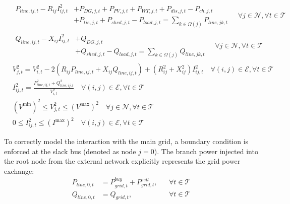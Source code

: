 \begin{subequations} \label{eq:distflow_original}
\begin{align}
    & \begin{aligned} \label{eq:P_balance}
        P_{line,ij,t} - R_{ij} I_{ij,t}^2 &+ P_{DG,j,t} + P_{PV,j,t} + P_{WT,j,t} + P_{dis,j,t} - P_{ch,j,t} \\
        &+ P_{tie,j,t} + P_{shed,j,t} - P_{load,j,t} = \sum_{k \in \Omega(j)} P_{line,jk,t}
    \end{aligned} \quad \forall j \in \mathcal{N}, \forall t \in \mathcal{T} \\
    & \begin{aligned} \label{eq:Q_balance}
        Q_{line,ij,t} - X_{ij} I_{ij,t}^2 &+ Q_{DG,j,t} \\
        &+ Q_{shed,j,t} - Q_{load,j,t} = \sum_{k \in \Omega(j)} Q_{line,jk,t}
    \end{aligned} \quad \forall j \in \mathcal{N}, \forall t \in \mathcal{T} \\
    & V_{j,t}^2 = V_{i,t}^2 - 2(R_{ij}P_{line,ij,t} + X_{ij}Q_{line,ij,t}) + (R_{ij}^2 + X_{ij}^2)I_{ij,t}^2 \quad \forall (i,j) \in \mathcal{E}, \forall t \in \mathcal{T} \label{eq:voltage_drop} \\
    & I_{ij,t}^2 = \frac{P_{line,ij,t}^2 + Q_{line,ij,t}^2}{V_{i,t}^2} \quad \forall (i,j) \in \mathcal{E}, \forall t \in \mathcal{T} \label{eq:current_def} \\
    & (V^{\text{min}})^2 \leq V_{j,t}^2 \leq (V^{\text{max}})^2 \quad \forall j \in \mathcal{N}, \forall t \in \mathcal{T} \label{eq:voltage_limit} \\
    & 0 \leq I_{ij,t}^2 \leq (I^{\text{max}})^2 \quad \forall (i,j) \in \mathcal{E}, \forall t \in \mathcal{T} \label{eq:current_limit}
\end{align}
\end{subequations}

To correctly model the interaction with the main grid, a boundary condition is enforced at the slack bus (denoted as node $j=0$). The branch power injected into the root node from the external network explicitly represents the grid power exchange:
\begin{subequations} \label{eq:distflow_boundary}
\begin{align}
    P_{line,0,t} &= P_{grid,t}^{buy} + P_{grid,t}^{sell}, && \forall t \in \mathcal{T} \label{eq:boundary_P} \\
    Q_{line,0,t} &= Q_{grid,t}, && \forall t \in \mathcal{T} \label{eq:boundary_Q}
\end{align}
\end{subequations}

